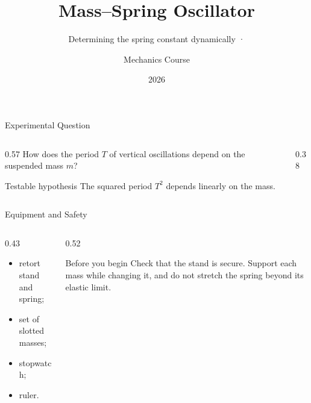 \title[Mass--Spring Oscillator]{Mass--Spring Oscillator}
\subtitle{Determining the spring constant dynamically · \labversionlabel}
\author{Mechanics Course}
\date{2026}



\begin{frame}[plain]
  \titlepage
\end{frame}

\begin{frame}{Experimental Question}
  \vspace{0.7em}
  \begin{columns}[T,onlytextwidth]
    \begin{column}{0.57\textwidth}
      {\Large How does the period $T$ of vertical oscillations depend on the suspended mass $m$?}
      \vspace{0.9em}
      \begin{block}{Testable hypothesis}
        The squared period $T^2$ depends linearly on the mass.
      \end{block}
    \end{column}
    \begin{column}{0.38\textwidth}
    \end{column}
  \end{columns}
\end{frame}

\begin{frame}{Equipment and Safety}
  \begin{columns}[T,onlytextwidth]
    \begin{column}{0.43\textwidth}
      \vspace{0.55em}
      \begin{itemize}
        \item retort stand and spring;
        \item set of slotted masses;
        \item stopwatch;
        \item ruler.
      \end{itemize}
    \end{column}
    \begin{column}{0.52\textwidth}
      \begin{alertblock}{Before you begin}
        Check that the stand is secure. Support each mass while changing it,
        and do not stretch the spring beyond its elastic limit.
      \end{alertblock}
    \end{column}
  \end{columns}
\end{frame}

